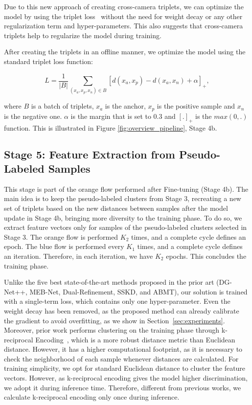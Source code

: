 \documentclass[journal]{IEEEtran}
\begin{document}
Due to this new approach of creating cross-camera triplets, we can optimize the model by using the triplet loss~\cite{schroff2015facenet} without the need for weight decay or any other regularization term and hyper-parameters. This also suggests that cross-camera triplets help to regularize the model during training.




After creating the triplets in an offline manner, we optimize the model using the standard triplet loss function:

\begin{equation}
\label{eq:LWHTL}
    L = \frac{1}{|B|}\sum_{(x_{a}, x_{p}, x_{n}) \in B} \left[d(x_{a}, x_{p}) - d(x_{a}, x_{n}) + \alpha \right]_{+},
\end{equation}

\noindent where $ B $ is a batch of triplets, $x_{a}$ is the anchor, $x_{p}$ is the positive sample and $x_{n} $ is the negative one. $ \alpha $ is the margin that is set to $0.3$ and $[.]_{+}$ is the $max(0, .)$ function. This is illustrated in Figure \ref{fig:overview_pipeline}, Stage 4b.  

\subsection{Stage 5: Feature Extraction from Pseudo-Labeled Samples}

This stage is part of the orange flow performed after Fine-tuning (Stage 4b). The main idea is to keep the pseudo-labeled clusters from Stage 3, recreating a new set of triplets based on the new distances between samples after the model update in Stage 4b, bringing more diversity to the training phase. To do so, we extract feature vectors only for samples of the pseudo-labeled clusters selected in Stage 3. The orange flow is performed $K_{2}$ times, and a complete cycle defines an epoch. The blue flow is performed every $K_{1}$ times, and a complete cycle defines an iteration. Therefore, in each iteration, we have $K_{2}$ epochs. This concludes the training phase. 

Unlike the five best state-of-the-art methods proposed in the prior art (DG-Net++, MEB-Net, Dual-Refinement, SSKD, and ABMT), our solution is trained with a single-term loss, which contains only one hyper-parameter. Even the weight decay has been removed, as the proposed method can already calibrate the gradient to avoid overfitting, as we show in Section~\ref{sec:experiments}. Moreover, prior work performs clustering on the training phase through k-reciprocal Encoding~\cite{zhong2017re}, which is a more robust distance metric than Euclidean distance. However, it has a higher computational footprint, as it is necessary to check the neighborhood of each sample whenever distances are calculated. For training simplicity, we opt for standard Euclidean distance to cluster the feature vectors. However, as k-reciprocal encoding gives the model higher discrimination, we adopt it during inference time. Therefore, different from previous works, we calculate k-reciprocal encoding only once during inference.
\end{document}
